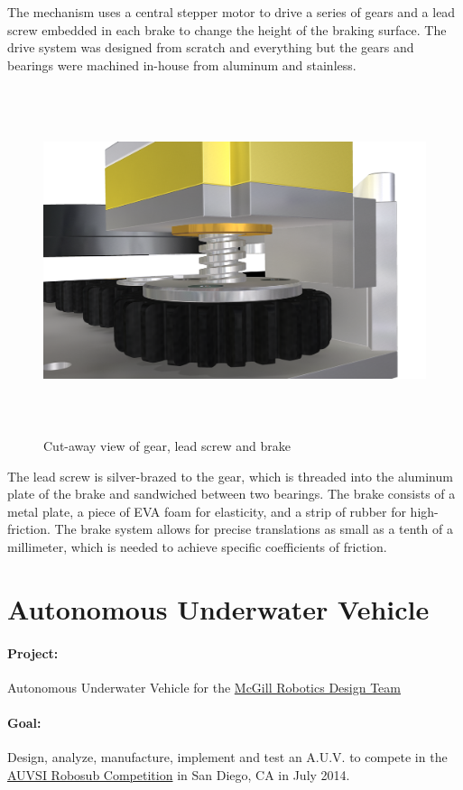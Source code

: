 \documentclass[12pt, landscape]{article}
\begin{document}
		The mechanism uses a central stepper motor to drive a series of gears and a lead screw embedded in each brake to change the height of the braking surface.  The drive system was designed from scratch and everything but the gears and bearings were machined in-house from aluminum and stainless.

		\begin{figure}[H]
			\centering
			\includegraphics[height=4in]{media/brake_detail_rear}
			\caption{Cut-away view of gear, lead screw and brake}
			\label{brake}
		\end{figure}

		The lead screw is silver-brazed to the gear, which is threaded into the aluminum plate of the brake and sandwiched between two bearings.  The brake consists of a metal plate, a piece of EVA foam for elasticity, and a strip of rubber for high-friction.  The brake system allows for precise translations as small as a tenth of a millimeter, which is needed to achieve specific coefficients of friction.

\clearpage

	\section{Autonomous Underwater Vehicle}
		\paragraph{Project:} Autonomous Underwater Vehicle for the \href{http://www.mcgillrobotics.com}{McGill Robotics Design Team}
		\paragraph{Goal:} Design, analyze, manufacture, implement and test an A.U.V. to compete in the \href{http://www.robosub.org}{AUVSI Robosub Competition} in San Diego, CA in July 2014.
\end{document}
